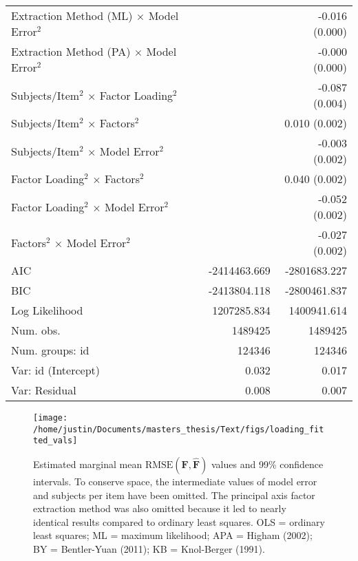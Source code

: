 \documentclass[
  english,
  man]{apa6}
\begin{document}
\begin{center}
\begin{longtable}{l D{)}{)}{11)0} D{)}{)}{11)0}}
Extraction Method (ML) $\times$ Model Error$^2$        &                   & -0.016 \; (0.000) \\
Extraction Method (PA) $\times$ Model Error$^2$        &                   & -0.000 \; (0.000) \\
Subjects/Item$^2$ $\times$ Factor Loading$^2$          &                   & -0.087 \; (0.004) \\
Subjects/Item$^2$ $\times$ Factors$^2$                 &                   & 0.010 \; (0.002)  \\
Subjects/Item$^2$ $\times$ Model Error$^2$             &                   & -0.003 \; (0.002) \\
Factor Loading$^2$ $\times$ Factors$^2$                &                   & 0.040 \; (0.002)  \\
Factor Loading$^2$ $\times$ Model Error$^2$            &                   & -0.052 \; (0.002) \\
Factors$^2$ $\times$ Model Error$^2$                   &                   & -0.027 \; (0.002) \\
\hline
AIC                                                    & -2414463.669      & -2801683.227      \\
BIC                                                    & -2413804.118      & -2800461.837      \\
Log Likelihood                                         & 1207285.834       & 1400941.614       \\
Num. obs.                                              & 1489425           & 1489425           \\
Num. groups: id                                        & 124346            & 124346            \\
Var: id (Intercept)                                    & 0.032             & 0.017             \\
Var: Residual                                          & 0.008             & 0.007             \\
\end{longtable}
\end{center}

\begin{figure}

{\centering \texttt{[image: /home/justin/Documents/masters\_thesis/Text/figs/loading\_fitted\_vals]} 

}

\caption{Estimated marginal mean $\textrm{RMSE}(\mathbf{F}, \hat{\mathbf{F}})$ values and 99\% confidence intervals. To conserve space, the intermediate values of model error and subjects per item have been omitted. The principal axis factor extraction method was also omitted because it led to nearly identical results compared to ordinary least squares. OLS = ordinary least squares; ML = maximum likelihood; APA = Higham (2002); BY = Bentler-Yuan (2011); KB = Knol-Berger (1991).}\label{fig:loading-mm}
\end{figure}
\end{document}

